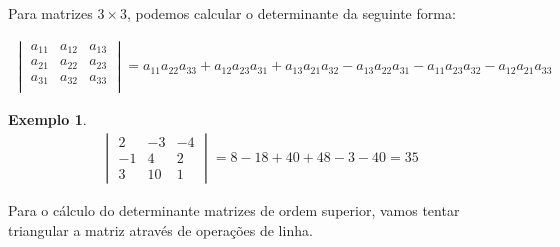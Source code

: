 \documentclass{article}
\newtheorem*{example}{Exemplo}
\begin{document}
\par\vspace{0.3cm} Para matrizes $3\times3$, podemos calcular o determinante da seguinte forma:

\begin{align*}
\begin{vmatrix}
a_{11} & a_{12} & a_{13} \\
a_{21} & a_{22} & a_{23} \\
a_{31} & a_{32} & a_{33} \\
\end{vmatrix} = a_{11}a_{22}a_{33} + a_{12}a_{23}a_{31} + a_{13}a_{21}a_{32} - a_{13}a_{22}a_{31} - a_{11}a_{23}a_{32} - a_{12}a_{21}a_{33}
\end{align*}

\begin{example}
	\begin{align*}
	\begin{vmatrix}
	2 & -3 & -4 \\
	-1 & 4 & 2 \\
	3 & 10 & 1
	\end{vmatrix} = 8 -18 + 40 + 48 - 3 - 40 = 35
	\end{align*}
\end{example}

\par\vspace{0.3cm} Para o cálculo do determinante matrizes de ordem superior, vamos tentar triangular a matriz através de operações de linha.
\end{document}
